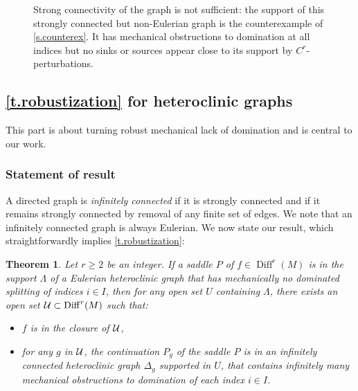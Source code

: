 \documentclass[11pt, a4paper]{amsart}
\theoremstyle{plain}
\newtheorem{theorem}{Theorem} %
\theoremstyle{definition}
\theoremstyle{remark}
\numberwithin{equation}{section}         %
\DeclareMathOperator{\Diff}{{Diff}}
\def\Diff{\operatorname{Diff}}
\begin{document}
\begin{figure}%
\begin{center}
\def\svgwidth{100pt}           %

\end{center}
\caption{\small Strong connectivity of the graph is not sufficient: the support of this strongly connected but non-Eulerian graph is the counterexample of  \cref{s.counterex}.  It has mechanical obstructions to domination at all indices but no sinks or sources appear close to its support by $C^r$-perturbations.}
\label{f.counterex3}
\end{figure} 












\subsection{\cref{t.robustization}  for heteroclinic graphs}\label{s.robustization}

This part is about turning robust  mechanical lack of domination and is central to our work. 


\subsubsection{Statement of result} A directed graph is {\em infinitely connected} if it is strongly connected and if it remains strongly connected by removal of any finite set of edges. We note that an infinitely connected graph is always Eulerian. We now state our result, which  straightforwardly implies \cref{t.robustization}:

\begin{theorem}\label{t.homcor}
Let $r\geq 2$ be an integer. If a saddle $P$ of $f\in \Diff^r(M)$ is in the support $\Lambda$ of a Eulerian heteroclinic graph that has mechanically no dominated splitting of indices $i\in I$, then for any open set $U$ containing $\Lambda$, there exists an open set $\cU\subset \Diff^r(M)$ such that:
\begin{itemize}
\item $f$ is in the closure of ${\mathcal U}$,
\item for any $g$ in ${\mathcal U}$, the continuation $P_g$ of the saddle $P$ is in an infinitely connected heteroclinic graph $\Delta_g$ supported in $U$, that contains infinitely many mechanical obstructions to domination of each index $i\in I$.
\end{itemize}
\end{theorem}
\end{document}
